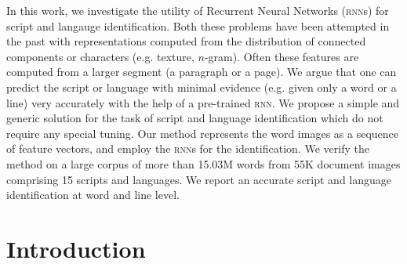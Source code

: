 In this work, we investigate the utility of Recurrent Neural Networks (\textsc{rnn}s) for script and langauge identification. Both these problems have been attempted in the past with representations computed from the distribution of connected components or characters (e.g. texture, $n$-gram). Often these features are computed from a larger segment (a paragraph or a page). We argue that one can predict the script or language with minimal evidence
(e.g. given only a word or a line) very accurately with the help of a pre-trained \textsc{rnn}. %
We propose a simple and generic solution for the task of script and language identification which do not require any special tuning.
Our method represents the word images as a sequence of feature vectors, and employ the \textsc{rnn}s for the identification. We verify the method on a large corpus of more than 15.03M words from 55K document images comprising 15 scripts and languages. We report an accurate script and language identification at word and line level.
%

\section{Introduction}
\label{sec:intro}

